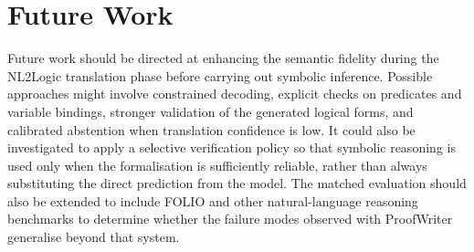 \documentclass[conference]{IEEEtran}
\begin{document}
\section*{Future Work}
Future work should be directed at enhancing the semantic fidelity during the NL2Logic translation phase before carrying out symbolic inference. Possible approaches might involve constrained decoding, explicit checks on predicates and variable bindings, stronger validation of the generated logical forms, and calibrated abstention when translation confidence is low. It could also be investigated to apply a selective verification policy so that symbolic reasoning is used only when the formalisation is sufficiently reliable, rather than always substituting the direct prediction from the model. The matched evaluation should also be extended to include FOLIO and other natural-language reasoning benchmarks to determine whether the failure modes observed with ProofWriter generalise beyond that system.


\end{document}
